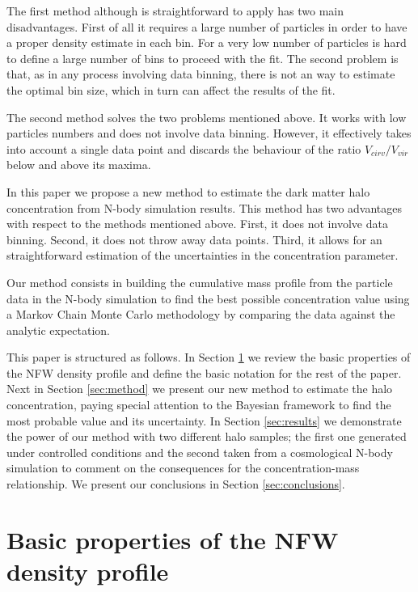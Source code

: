 \documentclass[useAMS,usenatbib]{mn2e}
\begin{document}
The first method although is straightforward to apply has two main
disadvantages. First of all it requires a large number of particles in
order to have a proper density estimate in each bin. For a very low
number of particles is hard to define a large number of bins to
proceed with the fit. The second problem is that, as in any process
involving data binning, there is not an way to estimate the optimal
bin size, which in turn can affect the results of the fit.

The second method solves the two problems mentioned above. It works
with low particles numbers and does not involve data binning. However,
it effectively takes into account a single data point and discards the
behaviour of the ratio $V_{cirv}/V_{vir}$ below and above its
maxima.

In this paper we propose a new method to estimate the dark matter halo
concentration from N-body simulation results. This method has two
advantages with respect to the methods mentioned above. First, it does
not involve data binning. Second, it does not throw away data
points. Third, it allows for an straightforward estimation of the
uncertainties in the concentration parameter.

Our method consists in building the cumulative mass profile from the
particle data in the N-body simulation to find the best possible
concentration value using a Markov Chain Monte Carlo methodology by
comparing the data against the analytic expectation.

This paper is structured as follows. In Section \ref{sec:basics} we
review the basic properties of the NFW density profile and define the
basic notation for the rest of the paper. Next in Section
\ref{sec:method} we present our new method to estimate the halo
concentration, paying special attention to the Bayesian framework to
find the most probable value and its uncertainty. In Section
\ref{sec:results} we demonstrate the power of our method with two
different halo samples; the first one generated under controlled
conditions and the second taken from a cosmological N-body
simulation to comment on the consequences for the concentration-mass
relationship. We present our conclusions in Section
\ref{sec:conclusions}.



\section{Basic properties of the NFW density profile}
\label{sec:basics}
\end{document}
